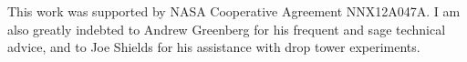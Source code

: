 \documentclass[aip,reprint, floatfix]{revtex4-1}
\begin{document}
\begin{acknowledgments}
This work was supported by NASA Cooperative Agreement NNX12A047A. I am also greatly indebted to Andrew Greenberg for his frequent and sage technical advice, and to Joe Shields for his assistance with drop tower experiments.
\end{acknowledgments}


%
%

%



\end{document}

